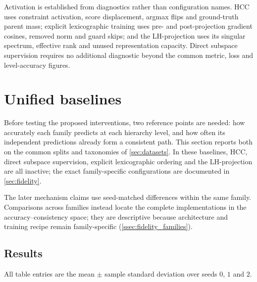 Activation is established from diagnostics rather than configuration names.
HCC uses constraint activation, score displacement, argmax flips and
ground-truth parent mass; explicit lexicographic training uses pre- and
post-projection gradient cosines, removed norm and guard skips; and the
LH-projection uses its singular spectrum, effective rank and unused
representation capacity. Direct subspace supervision requires no additional
diagnostic beyond the common metric, loss and level-accuracy figures.

\section{Unified baselines}
\label{sec:results_baselines}

Before testing the proposed interventions, two reference points are needed: how
accurately each family predicts at each hierarchy level, and how often its
independent predictions already form a consistent path. This section reports
both on the common splits and taxonomies of \cref{sec:datasets}. In these
baselines, HCC, direct subspace supervision, explicit lexicographic ordering and
the LH-projection are all inactive; the exact family-specific configurations are
documented in \cref{sec:fidelity}.

The later mechanism claims use seed-matched differences within the same family.
Comparisons across families instead locate the complete implementations in the
accuracy--consistency space; they are descriptive because architecture and
training recipe remain family-specific (\cref{ssec:fidelity_families}).

\subsection{Results}
\label{ssec:results_baseline_datasets}

\newcommand{\baselinemeanstd}[2]{\(#1\,{\scriptstyle\pm #2}\)}

All table entries are the mean $\pm$ sample standard deviation over seeds
$0$, $1$ and $2$.
%
%
%

